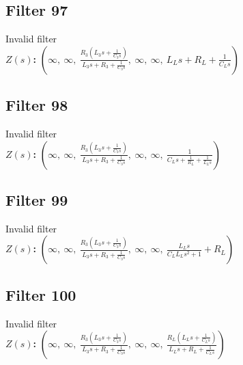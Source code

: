 \documentclass{article}
\begin{document}
\subsection*{Filter 97}
Invalid filter \\ 
\textbf{$Z(s)$:} $\left( \infty, \  \infty, \  \frac{R_{3} \left(L_{3} s + \frac{1}{C_{3} s}\right)}{L_{3} s + R_{3} + \frac{1}{C_{3} s}}, \  \infty, \  \infty, \  L_{L} s + R_{L} + \frac{1}{C_{L} s}\right)$ \\ 
\subsection*{Filter 98}
Invalid filter \\ 
\textbf{$Z(s)$:} $\left( \infty, \  \infty, \  \frac{R_{3} \left(L_{3} s + \frac{1}{C_{3} s}\right)}{L_{3} s + R_{3} + \frac{1}{C_{3} s}}, \  \infty, \  \infty, \  \frac{1}{C_{L} s + \frac{1}{R_{L}} + \frac{1}{L_{L} s}}\right)$ \\ 
\subsection*{Filter 99}
Invalid filter \\ 
\textbf{$Z(s)$:} $\left( \infty, \  \infty, \  \frac{R_{3} \left(L_{3} s + \frac{1}{C_{3} s}\right)}{L_{3} s + R_{3} + \frac{1}{C_{3} s}}, \  \infty, \  \infty, \  \frac{L_{L} s}{C_{L} L_{L} s^{2} + 1} + R_{L}\right)$ \\ 
\subsection*{Filter 100}
Invalid filter \\ 
\textbf{$Z(s)$:} $\left( \infty, \  \infty, \  \frac{R_{3} \left(L_{3} s + \frac{1}{C_{3} s}\right)}{L_{3} s + R_{3} + \frac{1}{C_{3} s}}, \  \infty, \  \infty, \  \frac{R_{L} \left(L_{L} s + \frac{1}{C_{L} s}\right)}{L_{L} s + R_{L} + \frac{1}{C_{L} s}}\right)$ \\ 
\end{document}
